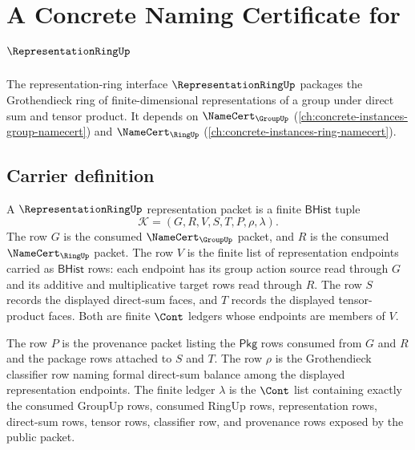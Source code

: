 \chapter{A Concrete Naming Certificate for $\RepresentationRingUp$}
\label{ch:concrete-instances-representationring-namecert}

The representation-ring interface $\RepresentationRingUp$ packages the Grothendieck ring of finite-dimensional representations of a group under direct sum and tensor product. It depends on $\NameCert_{\GroupUp}$ (\autoref{ch:concrete-instances-group-namecert}) and $\NameCert_{\RingUp}$ (\autoref{ch:concrete-instances-ring-namecert}).

\section{Carrier definition}
\label{sec:representationring-carrier}

\begin{definition}
\label{def:representationring-bhist-representation-packet}
A $\RepresentationRingUp$ representation packet is a finite $\mathsf{BHist}$
tuple
$$
\mathcal{K}=(G,R,V,S,T,P,\rho,\lambda).
$$
The row $G$ is the consumed $\NameCert_{\GroupUp}$ packet, and $R$ is the
consumed $\NameCert_{\RingUp}$ packet. The row $V$ is the finite list of
representation endpoints carried as $\mathsf{BHist}$ rows: each endpoint has
its group action source read through $G$ and its additive and multiplicative
target rows read through $R$. The row $S$ records the displayed direct-sum
faces, and $T$ records the displayed tensor-product faces. Both are finite
$\Cont$ ledgers whose endpoints are members of $V$.

The row $P$ is the provenance packet listing the $\mathsf{Pkg}$ rows consumed
from $G$ and $R$ and the package rows attached to $S$ and $T$. The row $\rho$
is the Grothendieck classifier row naming formal direct-sum balance among the
displayed representation endpoints. The finite ledger $\lambda$ is the
$\Cont$ list containing exactly the consumed GroupUp rows, consumed RingUp
rows, representation rows, direct-sum rows, tensor rows, classifier row, and
provenance rows exposed by the public packet.
\end{definition}

